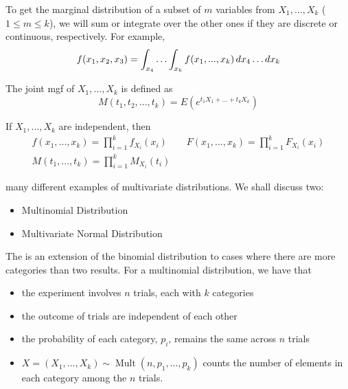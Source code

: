 \documentclass[notoc,notitlepage]{tufte-book}
\DeclareMathOperator{\Mult}{Mult }
\begin{document}
\begin{defn}
\label{defn:k_variate_marginal_distribution}
  To get the marginal distribution of a subset of $m$ variables from $X_1, ..., X_k$ ($1 \leq m \leq k$), we will sum or integrate over the other ones if they are discrete or continuous, respectively. For example,
  \begin{equation*}
    f(x_1, x_2, x_3) = \int_{x_4} \hdots \int_{x_k} f(x_1, ..., x_k) \mathop{}\!d{x_4} \hdots \mathop{}\!d{x_k}
  \end{equation*}
\end{defn}

\begin{defn}
\label{defn:k_variate_joint_mgf}
  The joint mgf of $X_1, ..., X_k$ is defined as
  \begin{equation*}
    M(t_1, t_2, ..., t_k) = E \left( e^{t_1 X_1 + \hdots + t_k X_k} \right)
  \end{equation*}
\end{defn}

\begin{propo}
\label{propo:independence_for_multivariate_cases}
  If $X_1, ..., X_k$ are independent, then
  \begin{gather*}
    f(x_1, ..., x_k) = \prod_{i=1}^{k} f_{X_i}(x_i) \qquad F(x_1, ..., x_k) = \prod_{i=1}^{k} F_{X_i}(x_i) \\
    M(t_1, ..., t_k) = \prod_{i=1}^{k} M_{X_i}(t_i)
  \end{gather*}
\end{propo}

 many different examples of multivariate distributions. We shall discuss two:
\begin{itemize}
  \item Multinomial Distribution
  \item Multivariate Normal Distribution
\end{itemize}

The  is an extension of the binomial distribution to cases where there are more categories than two results. For a multinomial distribution, we have that
\begin{itemize}
  \item the experiment involves $n$ trials, each with $k$ categories
  \item the outcome of trials are independent of each other
  \item the probability of each category, $p_i$, remains the same across $n$ trials
  \item $X = (X_1, ..., X_k) \sim \Mult(n, p_1, ..., p_k)$ counts the number of elements in each category among the $n$ trials.
\end{itemize}
\end{document}
